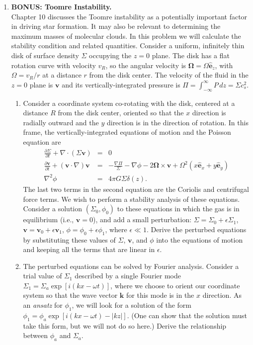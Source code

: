 \documentclass{article}
\newcommand{\veco}{{\mathbf{\Omega}}}
\newcommand{\vecv}{\mathbf{v}}
\newcommand{\ehat}{\hat{\mathbf{e}}}
\begin{document}
\begin{enumerate}
\item \textbf{BONUS: Toomre Instability.}\\
Chapter 10 discusses the Toomre instability as a potentially important factor in driving star formation. It may also be relevant to determining the maximum masses of molecular clouds. In this problem we will calculate the stability condition and related quantities. Consider a uniform, infinitely thin disk of surface density $\Sigma$ occupying the $z=0$ plane. The disk has a flat rotation curve with velocity $v_R$, so the angular velocity is $\veco=\Omega \ehat_z$, with $\Omega = v_R/r$ at a distance $r$ from the disk center. The velocity of the fluid in the $z=0$ plane is $\vecv$ and its vertically-integrated pressure is $\Pi=\int_{-\infty}^{\infty} P \, dz = \Sigma c_s^2$. 
\begin{enumerate}
\item Consider a coordinate system co-rotating with the disk, centered at a distance $R$ from the disk center, oriented so that the $x$ direction is radially outward and the $y$ direction is in the direction of rotation. In this frame, the vertically-integrated equations of motion and the Poisson equation are
\begin{eqnarray*}
\frac{\partial \Sigma}{\partial t} + \nabla \cdot (\Sigma \vecv) & = & 0 \\
\frac{\partial \vecv}{\partial t} + (\vecv\cdot\nabla)\vecv & = & -\frac{\nabla \Pi}{\Sigma} - \nabla \phi - 2\veco \times \vecv + \Omega^2 (x \ehat_x + y \ehat_y) \\
\nabla^2 \phi & = & 4 \pi G \Sigma \delta(z).
\end{eqnarray*}
The last two terms in the second equation are the Coriolis and centrifugal force terms.
We wish to perform a stability analysis of these equations. Consider a solution $(\Sigma_0, \phi_0)$ to these equations in which the gas is in equilibrium (i.e., $\vecv=0$), and add a small perturbation: $\Sigma=\Sigma_0 + \epsilon \Sigma_1$, $\vecv = \vecv_0 + \epsilon \vecv_1$, $\phi=\phi_0 + \epsilon \phi_1$, where $\epsilon \ll 1$. Derive the perturbed equations by substituting these values of $\Sigma$, $\vecv$, and $\phi$ into the equations of motion and keeping all the terms that are linear in $\epsilon$.
\item The perturbed equations can be solved by Fourier analysis. Consider a trial value of $\Sigma_1$ described by a single Fourier mode $\Sigma_1 = \Sigma_a \exp[i(kx - \omega t)]$, where we choose to orient our coordinate system so that the wave vector $\mathbf{k}$ for this mode is in the $x$ direction. As an {\it ansatz} for $\phi_1$, we will look for a solution of the form $\phi_1 = \phi_a \exp[i(kx - \omega t) - |k z|]$. (One can show that the solution must take this form, but we will not do so here.) Derive the relationship between $\phi_a$ and $\Sigma_a$.

\end{enumerate}
\end{enumerate}
\end{document}
